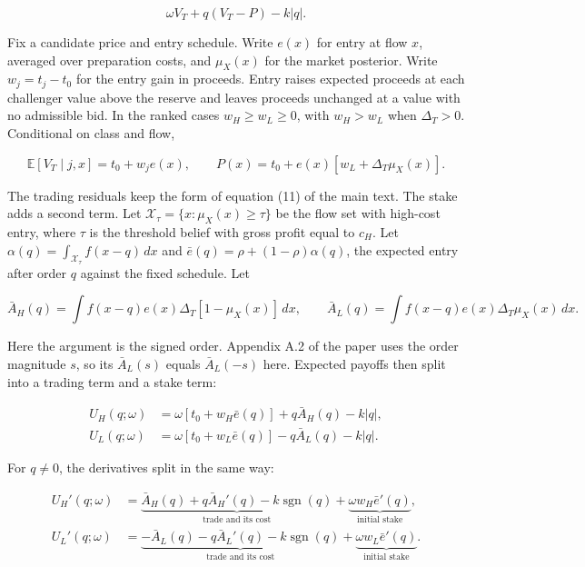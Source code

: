 \documentclass[
  11pt,
]{article}
\begin{document}
\[
\omega V_T+q(V_T-P)-k|q|.
\tag{OA.57}\label{eq:oa-oa-57}
\]

Fix a candidate price and entry schedule. Write \(e(x)\) for entry
at flow \(x\), averaged over preparation costs, and \(\mu_X(x)\) for
the market posterior. Write \(w_j=t_j-t_0\) for the entry gain in
proceeds. Entry raises expected proceeds at each challenger value
above the reserve and leaves proceeds unchanged at a value with no
admissible bid. In the ranked cases \(w_H\ge w_L\ge 0\), with
\(w_H>w_L\) when \(\Delta_T>0\). Conditional on
class and flow,

\[
\mathbb E[V_T\mid j,x]=t_0+w_j e(x),\qquad
P(x)=t_0+e(x)[w_L+\Delta_T\mu_X(x)].
\tag{OA.58}\label{eq:oa-oa-58}
\]

The trading residuals keep the form of equation (11) of the main
text. The stake adds a second term. Let
\(\mathcal X_\tau=\{x:\mu_X(x)\ge\tau\}\) be the flow set with high-cost entry,
where \(\tau\) is the threshold belief with gross profit equal to
\(c_H\). Let \(\alpha(q)=\int_{\mathcal X_\tau}f(x-q)\,dx\) and
\(\bar e(q)=\rho+(1-\rho)\alpha(q)\), the expected entry after order
\(q\) against the fixed schedule. Let

\[
\bar A_H(q)=\int f(x-q)e(x)\Delta_T[1-\mu_X(x)]\,dx,\qquad
\bar A_L(q)=\int f(x-q)e(x)\Delta_T\mu_X(x)\,dx.
\tag{OA.59}\label{eq:oa-oa-59}
\]

Here the argument is the signed order. Appendix A.2 of the paper uses the
order magnitude \(s\), so its \(\bar A_L(s)\) equals \(\bar A_L(-s)\) here.
Expected payoffs then split into a trading term and a stake term:

\[
\begin{aligned}
U_H(q;\omega)&=\omega[t_0+w_H\bar e(q)]+q\bar A_H(q)-k|q|,\\
U_L(q;\omega)&=\omega[t_0+w_L\bar e(q)]-q\bar A_L(q)-k|q|.
\end{aligned}
\tag{OA.60}\label{eq:oa-oa-60}
\]

For \(q\ne 0\), the derivatives split in the same way:

\[
\begin{aligned}
U_H'(q;\omega)&=
\underbrace{\bar A_H(q)+q\bar A_H'(q)-k\operatorname{sgn}(q)}_{\text{trade and its cost}}
+\underbrace{\omega w_H\bar e'(q)}_{\text{initial stake}},\\
U_L'(q;\omega)&=
\underbrace{-\bar A_L(q)-q\bar A_L'(q)-k\operatorname{sgn}(q)}_{\text{trade and its cost}}
+\underbrace{\omega w_L\bar e'(q)}_{\text{initial stake}}.
\end{aligned}
\tag{OA.61}\label{eq:oa-oa-61}
\]
\end{document}
